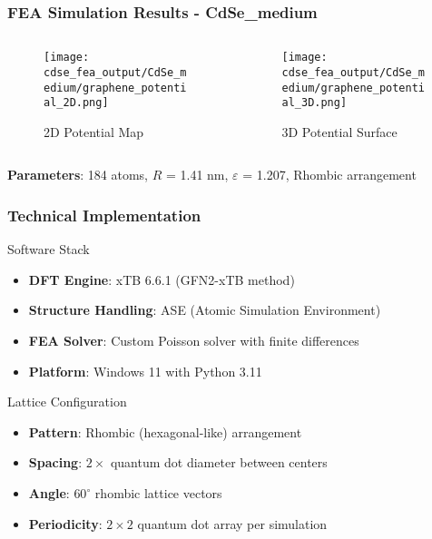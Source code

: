 \documentclass{beamer}
\begin{document}
\begin{frame}
\frametitle{FEA Simulation Results - CdSe\_medium}
\begin{columns}
\begin{column}{0.5\textwidth}
\begin{figure}
\centering
\texttt{[image: cdse\_fea\_output/CdSe\_medium/graphene\_potential\_2D.png]}
\caption{2D Potential Map}
\end{figure}
\end{column}
\begin{column}{0.5\textwidth}
\begin{figure}
\centering
\texttt{[image: cdse\_fea\_output/CdSe\_medium/graphene\_potential\_3D.png]}
\caption{3D Potential Surface}
\end{figure}
\end{column}
\end{columns}

\textbf{Parameters}: 184 atoms, $R$ = 1.41 nm, $\varepsilon$ = 1.207, Rhombic arrangement
\end{frame}

\begin{frame}
\frametitle{Technical Implementation}
\begin{block}{Software Stack}
\begin{itemize}
    \item \textbf{DFT Engine}: xTB 6.6.1 (GFN2-xTB method)
    \item \textbf{Structure Handling}: ASE (Atomic Simulation Environment)
    \item \textbf{FEA Solver}: Custom Poisson solver with finite differences
    \item \textbf{Platform}: Windows 11 with Python 3.11
\end{itemize}
\end{block}

\begin{block}{Lattice Configuration}
\begin{itemize}
    \item \textbf{Pattern}: Rhombic (hexagonal-like) arrangement
    \item \textbf{Spacing}: $2\times$ quantum dot diameter between centers
    \item \textbf{Angle}: $60^{\circ}$ rhombic lattice vectors
    \item \textbf{Periodicity}: $2\times 2$ quantum dot array per simulation
\end{itemize}
\end{block}
\end{frame}
\end{document}
